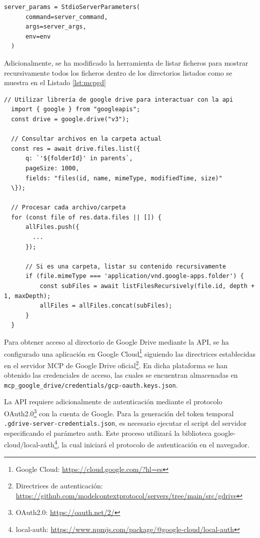 \begin{itemize}
\begin{lstlisting}[caption={mcp\_multi\_client.py: StdioServerParameters para el servidor MCP de Google Drive},label={lst:clientgd}]
  server_params = StdioServerParameters(
      command=server_command,
      args=server_args,
      env=env
  )
\end{lstlisting}


Adicionalmente, se ha modificado la herramienta de listar ficheros para mostrar recursivamente todos los ficheros dentro de los directorios listados como se muestra en el Listado \ref{lst:mcpgd}


\begin{lstlisting}[caption={index\_mod.js: herramienta gdrive\_list\_files utilizando la API de Google Drive},label={lst:mcpgd}]
  // Utilizar librería de google drive para interactuar con la api
  import { google } from "googleapis";
  const drive = google.drive("v3"); 

  // Consultar archivos en la carpeta actual
  const res = await drive.files.list({
      q: `'${folderId}' in parents`,
      pageSize: 1000,
      fields: "files(id, name, mimeType, modifiedTime, size)"
  \});

  // Procesar cada archivo/carpeta
  for (const file of res.data.files || []) {
      allFiles.push({
        ...
      });
      
      // Si es una carpeta, listar su contenido recursivamente
      if (file.mimeType === 'application/vnd.google-apps.folder') {
          const subFiles = await listFilesRecursively(file.id, depth + 1, maxDepth);
          allFiles = allFiles.concat(subFiles);
      }
  }
\end{lstlisting}
Para obtener acceso al directorio de Google Drive mediante la API, se ha configurado una aplicación en Google Cloud\footnote{Google Cloud: \url{https://cloud.google.com/?hl=es}} siguiendo las directrices establecidas en el servidor MCP de Google Drive oficial\footnote{Directrices de autenticación: \url{https://github.com/modelcontextprotocol/servers/tree/main/src/gdrive}}. En dicha plataforma se han obtenido las credenciales de acceso, las cuales se encuentran almacenadas en \texttt{mcp\_google\_drive/credentials/gcp-oauth.keys.json}.

La API requiere adicionalmente de autenticación mediante el protocolo OAuth2.0\footnote{OAuth2.0: \url{https://oauth.net/2/}} con la cuenta de Google. Para la generación del token temporal \texttt{.gdrive-server-credentials.json}, es necesario ejecutar el script del servidor especificando el parámetro auth. Este proceso utilizará la biblioteca google-cloud/local-auth\footnote{local-auth: \url{https://www.npmjs.com/package/@google-cloud/local-auth}}, la cual iniciará el protocolo de autenticación en el navegador.

\end{itemize}

